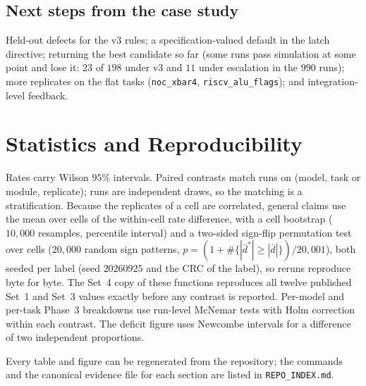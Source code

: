 \documentclass[11pt]{article}
\begin{document}
\subsection{Next steps from the case study}

Held-out defects for the v3 rules; a specification-valued default in the latch
directive; returning the best candidate so far (some runs pass simulation at some
point and lose it: $23$ of $198$ under v3 and $11$ under escalation in the $990$
runs); more replicates on the flat tasks (\texttt{noc\_xbar4},
\texttt{riscv\_alu\_flags}); and integration-level feedback.

\section{Statistics and Reproducibility}
\label{s:stats}

Rates carry Wilson $95\%$ intervals. Paired contrasts match runs on (model, task
or module, replicate); runs are independent draws, so the matching is a
stratification. Because the replicates of a cell are correlated, general claims
use the mean over cells of the within-cell rate difference, with a cell bootstrap
($10{,}000$ resamples, percentile interval) and a two-sided sign-flip
permutation test over cells ($20{,}000$ random sign patterns,
$p = (1 + \#\{|\bar d^{*}| \geq |\bar d|\}) / 20{,}001$), both seeded per label
(seed $20260925$ and the CRC of the label), so reruns reproduce byte for byte. The Set~4 copy of
these functions reproduces all twelve published Set~1 and Set~3 values exactly
before any contrast is reported. Per-model and per-task Phase~3 breakdowns use
run-level McNemar tests with Holm correction within each contrast. The deficit
figure uses Newcombe intervals for a difference of two independent proportions.

Every table and figure can be regenerated from the repository; the commands and
the canonical evidence file for each section are listed in \texttt{REPO\_INDEX.md}.
\end{document}

